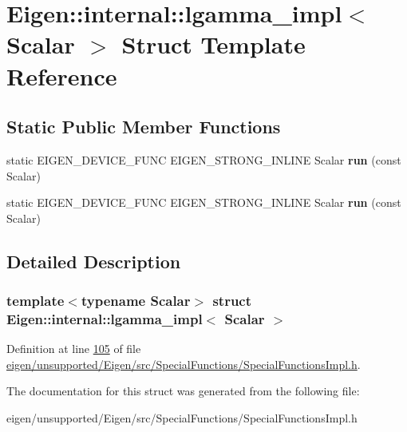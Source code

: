 \hypertarget{struct_eigen_1_1internal_1_1lgamma__impl}{}\section{Eigen\+:\+:internal\+:\+:lgamma\+\_\+impl$<$ Scalar $>$ Struct Template Reference}
\label{struct_eigen_1_1internal_1_1lgamma__impl}
\subsection*{Static Public Member Functions}
\begin{DoxyCompactItemize}
\item 
\mbox{\label{struct_eigen_1_1internal_1_1lgamma__impl_a49b248188b843de5df6fec11e12627c5}} 
static E\+I\+G\+E\+N\+\_\+\+D\+E\+V\+I\+C\+E\+\_\+\+F\+U\+NC E\+I\+G\+E\+N\+\_\+\+S\+T\+R\+O\+N\+G\+\_\+\+I\+N\+L\+I\+NE Scalar {\bfseries run} (const Scalar)
\item 
\mbox{\label{struct_eigen_1_1internal_1_1lgamma__impl_a49b248188b843de5df6fec11e12627c5}} 
static E\+I\+G\+E\+N\+\_\+\+D\+E\+V\+I\+C\+E\+\_\+\+F\+U\+NC E\+I\+G\+E\+N\+\_\+\+S\+T\+R\+O\+N\+G\+\_\+\+I\+N\+L\+I\+NE Scalar {\bfseries run} (const Scalar)
\end{DoxyCompactItemize}


\subsection{Detailed Description}
\subsubsection*{template$<$typename Scalar$>$\newline
struct Eigen\+::internal\+::lgamma\+\_\+impl$<$ Scalar $>$}



Definition at line \hyperlink{eigen_2unsupported_2_eigen_2src_2_special_functions_2_special_functions_impl_8h_source_l00105}{105} of file \hyperlink{eigen_2unsupported_2_eigen_2src_2_special_functions_2_special_functions_impl_8h_source}{eigen/unsupported/\+Eigen/src/\+Special\+Functions/\+Special\+Functions\+Impl.\+h}.



The documentation for this struct was generated from the following file\+:\begin{DoxyCompactItemize}
\item 
eigen/unsupported/\+Eigen/src/\+Special\+Functions/\+Special\+Functions\+Impl.\+h\end{DoxyCompactItemize}
